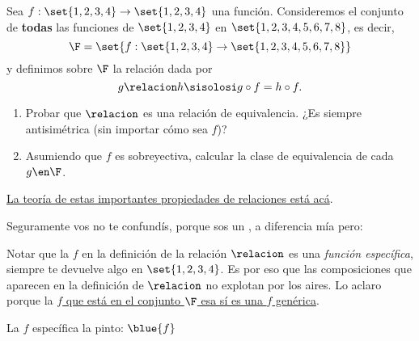 \begin{enunciado}{\ejercicio}
  Sea $f: \set{1,2,3,4} \to \set{1,2,3,4}$ una función.
  Consideremos el conjunto de \textbf{todas} las funciones de $\set{1,2,3,4}$ en $\set{1,2,3,4,5,6,7,8}$, es decir,
  $$
    \F = \set{f: \set{1,2,3,4} \to \set{1,2,3,4,5,6,7,8}}
  $$
  y definimos sobre $\F$ la relación dada por
  $$
    g \relacion h \sisolosi g \circ f = h\circ f.
  $$

  \begin{enumerate}[label=\roman*)]
    \item Probar  que $\relacion$ es una relación de equivalencia. ¿Es siempre antisimétrica (sin importar cómo sea $f$)?

    \item Asumiendo que $f$ es sobreyectiva, calcular la clase de equivalencia de cada $g \en \F$.
  \end{enumerate}
\end{enunciado}

\hyperlink{teoria-1:relaciones}{La teoría de estas importantes propiedades de relaciones está acá}.

Seguramente vos no te confundís, porque sos un {}, a diferencia mía pero:

\begin{center}
  \red{\atencion}
  \parbox{0.9\textwidth}{
    Notar que la $f$ en la definición de la relación $\relacion$
    es una \textit{función específica}, siempre te devuelve algo en $\set{1,2,3,4}$. Es por eso que las composiciones que aparecen en la definición
    de $\relacion$ no explotan  por los aires. Lo aclaro porque la \underline{$f$ que está en el conjunto $\F$ esa sí es una $f$ genérica}.

    La $f$ específica la pinto: $\blue{f}$
  }
  \red{\atencion}
\end{center}

